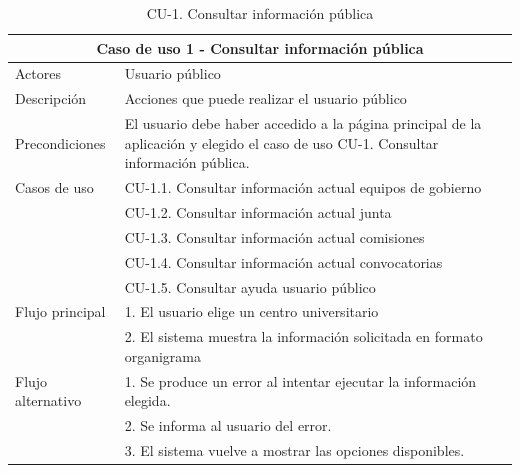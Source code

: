 \begin{table}[H]
\caption{CU-1. Consultar información pública}\label{tab:CU-1}
\begin{center}
    \begin{tabular}{|l|p{12cm}|}
    \hline
    \multicolumn{2}{|c|}{Caso de uso 1 - Consultar información pública} \\ 
    \hline \hline
    Actores                 &   Usuario público          \\ \hline
    Descripción             &   Acciones que puede realizar el usuario público \\  \hline
    Precondiciones          &   El usuario debe haber accedido a la página principal de la aplicación y elegido el caso de uso CU-1. Consultar información pública.   \\  \hline
    Casos de uso            &   CU-1.1. Consultar información actual equipos de gobierno \\  
    & CU-1.2. Consultar información actual junta \\ 
    & CU-1.3. Consultar información actual comisiones \\
    & CU-1.4. Consultar información actual convocatorias \\
    & CU-1.5. Consultar ayuda usuario público\\

    \hline
    Flujo principal     &   1. El usuario elige un centro universitario \\ 
    & 2. El sistema muestra la información solicitada en formato organigrama \\ \hline
    Flujo alternativo    &  1. Se produce un error al intentar ejecutar la información elegida. \\ 
                            &  2. Se informa al usuario del error.  \\  
                            &  3. El sistema vuelve a mostrar las opciones disponibles.  \\  \hline    
            \end{tabular}
        \end{center}
    \end{table}


